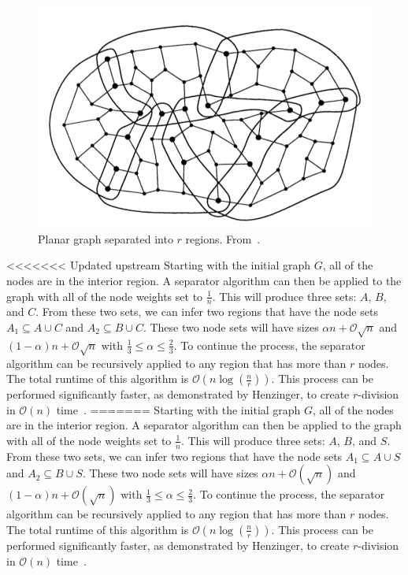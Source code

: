 \documentclass[11pt]{article}
\begin{document}
\begin{figure}[!htb]
    \centering
    \includegraphics[width=.5\textwidth]{rsep}
    \caption{Planar graph separated into $r$ regions. From~\cite{federickson1987fast}.}
    \label{fig:rsep}
\end{figure}

<<<<<<< Updated upstream
Starting with the initial graph $G$, all of the nodes are in the interior region. A separator algorithm can then be applied to the graph with all of the node weights set to $\frac{1}{n}$. This will produce three sets: $A$, $B$, and $C$. From these two sets, we can infer two regions that have the node sets $A_1 \subseteq A \cup C$ and $A_2 \subseteq B \cup C$. These two node sets will have sizes $\alpha n + \mathcal{O}\sqrt{n}$ and $(1 - \alpha) n + \mathcal{O}\sqrt{n}$ with $\frac{1}{3} \leq \alpha \leq \frac{2}{3}$. To continue the process, the separator algorithm can be recursively applied to any region that has more than $r$ nodes. The total runtime of this algorithm is $\mathcal{O} \left (n \log \left (\frac{n}{r} \right ) \right )$. This process can be performed significantly faster, as demonstrated by Henzinger, to create $r$-division in $\mathcal{O}(n)$ time~\cite{henzinger1997faster}.
=======
Starting with the initial graph $G$, all of the nodes are in the interior region. A separator algorithm can then be applied to the graph with all of the node weights set to $\frac{1}{n}$. This will produce three sets: $A$, $B$, and $S$. From these two sets, we can infer two regions that have the node sets $A_1 \subseteq A \cup S$ and $A_2 \subseteq B \cup S$. These two node sets will have sizes $\alpha n + \mathcal{O}(\sqrt{n})$ and $(1 - \alpha) n + \mathcal{O}(\sqrt{n})$ with $\frac{1}{3} \leq \alpha \leq \frac{2}{3}$. To continue the process, the separator algorithm can be recursively applied to any region that has more than $r$ nodes. The total runtime of this algorithm is $\mathcal{O} \left (n \log \left (\frac{n}{r} \right ) \right )$. This process can be performed significantly faster, as demonstrated by Henzinger, to create $r$-division in $\mathcal{O}(n)$ time~\cite{henzinger1997faster}.
\end{document}
